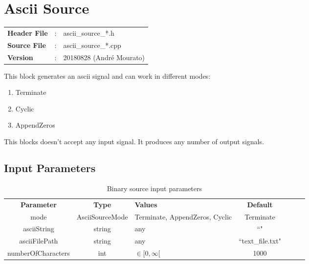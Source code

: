 \clearpage

\section{Ascii Source}

\begin{tcolorbox}	
	\begin{tabular}{p{2.75cm} p{0.2cm} p{10.5cm}} 	
		\textbf{Header File}   &:& ascii\_source\_*.h \\
		\textbf{Source File}   &:& ascii\_source\_*.cpp \\
        \textbf{Version}       &:& 20180828 (Andr\'e Mourato)
	\end{tabular}
\end{tcolorbox}

\maketitle
This block generates an ascii signal and can work in different modes:

\begin{multicols}{3}
\begin{enumerate}
	\item Terminate
	\item Cyclic
	\item AppendZeros
\end{enumerate}
\end{multicols}

This blocks doesn't accept any input signal. It produces any number of output signals.

\subsection*{Input Parameters}

\begin{table}[h]
	\centering
	\begin{tabular}{|c|c|p{60mm}|c|ccp{60mm}}
		\cline{1-4}
		\textbf{Parameter} & \textbf{Type} & \textbf{Values} &   \textbf{Default}& \\ \cline{1-4}
		mode & AsciiSourceMode & Terminate, AppendZeros, Cyclic & Terminate \\ \cline{1-4}
        asciiString & string & any & ``" \\ \cline{1-4}
        asciiFilePath & string & any & ``text\_file.txt" \\ \cline{1-4}
        numberOfCharacters & int & $ \in [0,\infty[$ & 1000 \\ \cline{1-4}

	\end{tabular}
	\caption{Binary source input parameters}
	\label{table:bin_sour_in_par}
\end{table}

